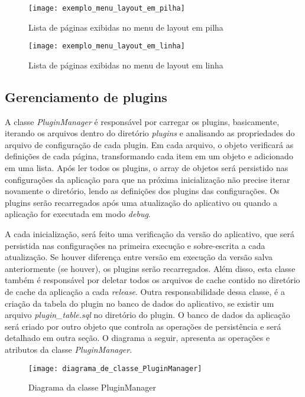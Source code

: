 \begin{figure}[H]
	\texttt{[image: exemplo\_menu\_layout\_em\_pilha]}
	\centering
	\caption{Lista de páginas exibidas no menu de layout em pilha}
\end{figure}

\begin{figure}[H]
	\texttt{[image: exemplo\_menu\_layout\_em\_linha]}
	\centering
	\caption{Lista de páginas exibidas no menu de layout em linha}
\end{figure}


\subsection{Gerenciamento de plugins}\label{sec:solucao-desenvolvida}
A classe \textit{PluginManager} é responsável por carregar os plugins, basicamente, iterando os arquivos dentro do diretório \textit{plugins} e analisando as propriedades do arquivo de configuração de cada plugin. Em cada arquivo, o objeto verificará as definições de cada página, transformando cada item em um objeto e adicionado em uma lista. Após ler todos os plugins, o array de objetos será persistido nas configurações da aplicação para que na próxima inicialização não precise iterar novamente o diretório, lendo as definições dos plugins das configurações. Os plugins serão recarregados após uma atualização do aplicativo ou quando a aplicação for executada em modo \textit{debug}.\par
A cada inicialização, será feito uma verificação da versão do aplicativo, que será persistida nas configurações na primeira execução e sobre-escrita a cada atualização. Se houver diferença entre versão em execução da versão salva anteriormente (se houver), os plugins serão recarregados. Além disso, esta classe também é responsável por deletar todos os arquivos de cache contido no diretório de cache da aplicação a cada \textit{release}. Outra responsabilidade dessa classe, é a criação da tabela do plugin no banco de dados do aplicativo, se existir um arquivo \textit{plugin\_table.sql} no diretório do plugin. O banco de dados da aplicação será criado por outro objeto que controla as operações de persistência e será detalhado em outra seção. O diagrama a seguir, apresenta as operações e atributos da classe \textit{PluginManager}.

\begin{figure}[H]
	\texttt{[image: diagrama\_de\_classe\_PluginManager]}
	\centering
	\caption{Diagrama da classe PluginManager}
\end{figure}

